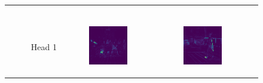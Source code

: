 \begin{figure}
\begin{tabular}{r p{\horspace} p{\horspace} p{\horspace}}
\begin{subfigure}[b]{\subfigwidth}
    \end{subfigure} \\
    Head 1 &
    \begin{subfigure}[b]{\subfigwidth}
        \includegraphics[width=\subfigwidth]{images/vit_attention/1/attn-head0.png}
    \end{subfigure}
    \hfill &
    \begin{subfigure}[b]{\subfigwidth}
        \includegraphics[width=\subfigwidth]{images/vit_attention/2/attn-head0.png}

\end{subfigure}
\end{tabular}
\end{figure}
